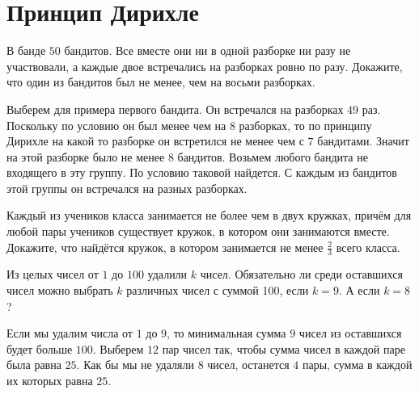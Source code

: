 \documentclass[12pt]{book}
\begin{document}
\begin{solution}
\end{solution}



\section*{Принцип Дирихле}

\begin{task}
В банде $50$ бандитов. Все вместе они ни в одной разборке ни разу не участвовали, а каждые двое встречались на разборках ровно по разу. Докажите, что один из бандитов был не менее, чем на восьми разборках. 
\end{task}

\begin{solution}
Выберем для примера первого бандита. Он встречался на разборках $49$ раз. Поскольку по условию он был менее чем на $8$ разборках, то по принципу Дирихле на какой то разборке он встретился не менее чем с $7$ бандитами. Значит на этой разборке было не менее $8$ бандитов. Возьмем любого бандита не входящего в эту группу. По условию таковой найдется. С каждым из бандитов этой группы он встречался на разных разборках.
\end{solution}

\begin{task} Каждый из учеников класса занимается не более чем в двух кружках, причём для любой пары учеников существует кружок, в котором они занимаются вместе. Докажите, что найдётся кружок, в котором занимается не менее $\frac{2}{3}$ всего класса.
\end{task}

\begin{solution}

\end{solution}

\begin{task} Из целых чисел от $1$ до $100$ удалили $k$ чисел. Обязательно ли среди оставшихся чисел можно выбрать $k$ различных чисел с суммой 100, если $k = 9$. А если $k = 8$?
\end{task}

\begin{solution}
Если мы удалим числа от $1$ до $9$, то минимальная сумма $9$ чисел из оставшихся будет больше $100$.
Выберем $12$ пар чисел так, чтобы сумма чисел в каждой паре была равна $25$. Как бы мы не удаляли $8$ чисел, останется $4$ пары, сумма в каждой их которых равна $25$. 
\end{solution}
\end{document}
